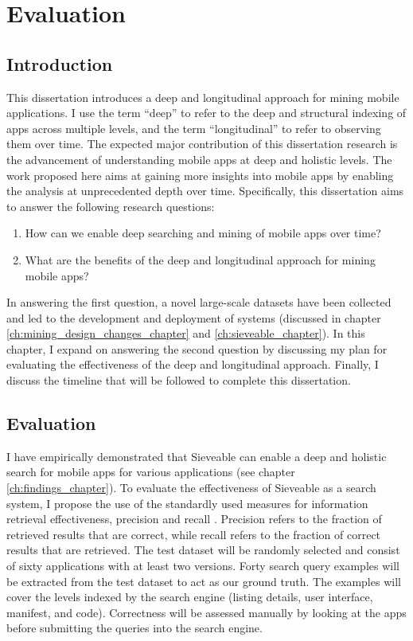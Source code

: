 \chapter{Evaluation}
\label{ch:evaluation}

\section{Introduction}
This dissertation introduces a deep and longitudinal approach for mining mobile applications.
I use the term ``deep'' to refer to the deep and structural indexing of apps across multiple levels, and the term ``longitudinal'' to refer to observing them over time.
The expected major contribution of this dissertation research is the advancement of understanding mobile apps at deep and holistic levels.
The work proposed here aims at gaining more insights into mobile apps by enabling the analysis at unprecedented depth over time.
Specifically, this dissertation aims to answer the following research questions:
\begin{enumerate}
	\item How can we enable deep searching and mining of mobile apps over time?
	\item What are the benefits of the deep and longitudinal approach for mining mobile apps?
\end{enumerate}

In answering the first question, a novel large-scale datasets have been collected and led to the development and deployment of systems (discussed in chapter \ref{ch:mining_design_changes_chapter} and \ref{ch:sieveable_chapter}).
In this chapter, I expand on answering the second question by discussing my plan for evaluating the effectiveness of the deep and longitudinal approach.
Finally, I discuss the timeline that will be followed to complete this dissertation.

\section{Evaluation}
I have empirically demonstrated that Sieveable can enable a deep and holistic search for mobile apps for various applications (see chapter \ref{ch:findings_chapter}).
To evaluate the effectiveness of Sieveable as a search system, I propose the use of the standardly used measures for information retrieval effectiveness, precision and recall \cite{manning_2008_intro_to_IR}.
Precision refers to the fraction of retrieved results that are correct, while recall refers to the fraction of correct results that are retrieved.
The test dataset will be randomly selected and consist of sixty applications with at least two versions.
Forty search query examples will be extracted from the test dataset to act as our ground truth.
The examples will cover the levels indexed by the search engine (listing details, user interface, manifest, and code).
Correctness will be assessed manually by looking at the apps before submitting the queries into the search engine.

